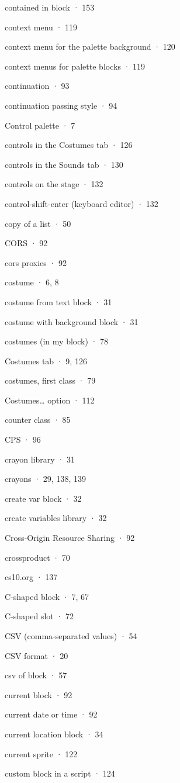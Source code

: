 contained in block · 153

context menu · 119

context menu for the palette background · 120

context menus for palette blocks · 119

continuation · 93

continuation passing style · 94

Control palette · 7

controls in the Costumes tab · 126

controls in the Sounds tab · 130

controls on the stage · 132

control-shift-enter (keyboard editor) · 132

copy of a list · 50

CORS · 92

cors proxies · 92

costume · 6, 8

costume from text block · 31

costume with background block · 31

costumes (in my block) · 78

Costumes tab · 9, 126

costumes, first class · 79

Costumes\ldots{} option · 112

counter class · 85

CPS · 96

crayon library · 31

crayons · 29, 138, 139

create var block · 32

create variables library · 32

Cross-Origin Resource Sharing · 92

crossproduct · 70

cs10.org · 137

C-shaped block · 7, 67

C-shaped slot · 72

CSV (comma-separated values) · 54

CSV format · 20

csv of block · 57

current block · 92

current date or time · 92

current location block · 34

current sprite · 122

custom block in a script · 124

